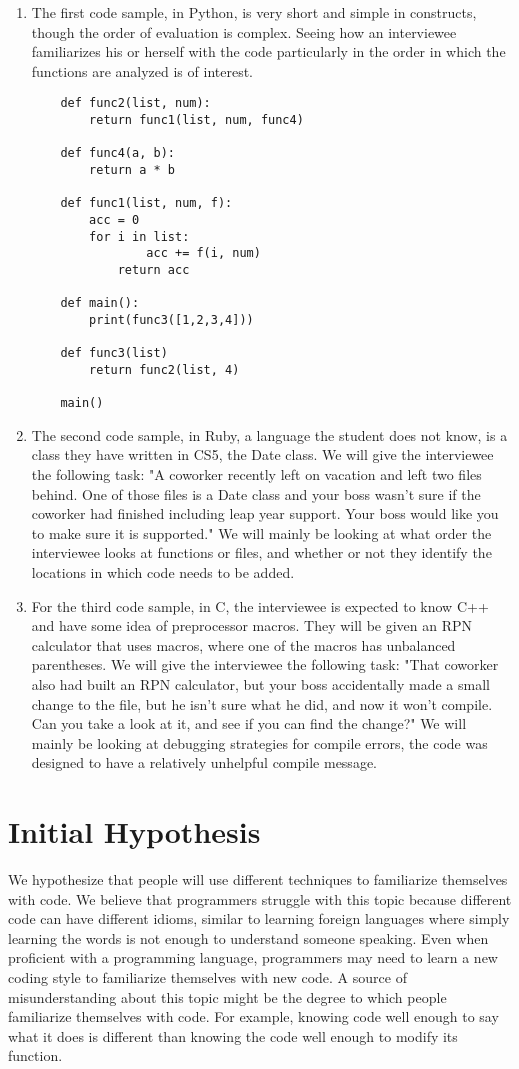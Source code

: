 \documentclass{article}
\begin{document}
\begin{enumerate}
  \item The first code sample, in Python, is very short and simple in constructs, though the order of evaluation is complex. Seeing how an interviewee familiarizes his or herself with the code particularly in the order in which the functions are analyzed is of interest. 
  \begin{verbatim}
    def func2(list, num):
        return func1(list, num, func4)

    def func4(a, b):
        return a * b

    def func1(list, num, f):
        acc = 0
        for i in list:
	            acc += f(i, num)
	        return acc

    def main():
        print(func3([1,2,3,4]))

    def func3(list)
        return func2(list, 4)

    main()
  \end{verbatim}
  \item The second code sample, in Ruby, a language the student does not know, is a class they have written in CS5, the Date class. We will give the interviewee the following task: "A coworker recently left on vacation and left two files behind. One of those files is a Date class and your boss wasn't sure if the coworker had finished including leap year support. Your boss would like you to make sure it is supported." We will mainly be looking at what order the interviewee looks at functions or files, and whether or not they identify the locations in which code needs to be added. 
  \item For the third code sample, in C, the interviewee is expected to know C++ and have some idea of preprocessor macros. They will be given an RPN calculator that uses macros, where one of the macros has unbalanced parentheses. We will give the interviewee the following task: "That coworker also had built an RPN calculator, but your boss accidentally made a small change to the file, but he isn't sure what he did, and now it won't compile.  Can you take a look at it, and see if you can find the change?" We will mainly be looking at debugging strategies for compile errors, the code was designed to have a relatively unhelpful compile message.
\end{enumerate}


\section{Initial Hypothesis}
We hypothesize that people will use different techniques to familiarize themselves with code. We believe that programmers struggle with this topic because different code can have different idioms, similar to learning foreign languages where simply learning the words is not enough to understand someone speaking. Even when proficient with a programming language, programmers may need to learn a new coding style to familiarize themselves with new code. A source of misunderstanding about this topic might be the degree to which people familiarize themselves with code. For example, knowing code well enough to say what it does is different than knowing the code well enough to modify its function.
\end{document}

